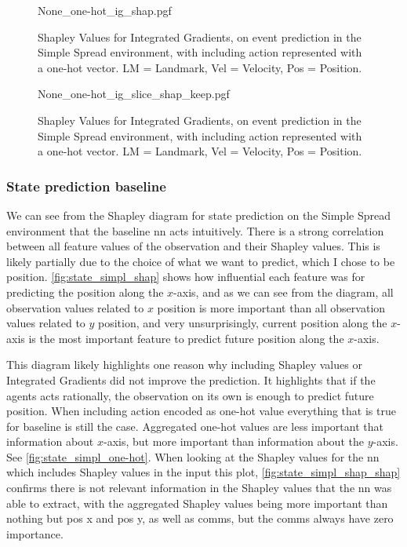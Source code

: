 \documentclass[UKenglish]{uiomasterthesis}
\begin{document}
\begin{figure}[H]
    \centering
{None_one-hot_ig_shap.pgf}
\caption{Shapley Values for Integrated Gradients, on event prediction in the Simple Spread environment, with including action represented with a one-hot vector. LM = Landmark, Vel = Velocity, Pos = Position.}
\label{fig:event_simpl_one-hot_ig_shap}
\end{figure}

\begin{figure}[H]
    \centering
{None_one-hot_ig_slice_shap_keep.pgf}
\caption{Shapley Values for Integrated Gradients, on event prediction in the Simple Spread environment, with including action represented with a one-hot vector. LM = Landmark, Vel = Velocity, Pos = Position.}
\label{fig:event_simpl_one-hot_ig_slice}
\end{figure}

\subsubsection{State prediction baseline}
We can see from the Shapley diagram for state prediction on the Simple Spread environment that the baseline \ac{nn} acts intuitively. There is a strong correlation between all feature values of the observation and their Shapley values. This is likely partially due to the choice of what we want to predict, which I chose to be position. \cref{fig:state_simpl_shap} shows how influential each feature was for predicting the position along the $x$-axis, and as we can see from the diagram, all observation values related to $x$ position is more important than all observation values related to $y$ position, and very unsurprisingly, current position along the $x$-axis is the most important feature to predict future position along the $x$-axis.

This diagram likely highlights one reason why including Shapley values or Integrated Gradients did not improve the prediction. It highlights that if the agents acts rationally, the observation on its own is enough to predict future position. When including action encoded as one-hot value everything that is true for baseline is still the case. Aggregated one-hot values are less important that information about $x$-axis, but more important than information about the $y$-axis. See \cref{fig:state_simpl_one-hot}. When looking at the Shapley values for the \ac{nn} which includes Shapley values in the input this plot, \cref{fig:state_simpl_shap_shap} confirms there is not relevant information in the Shapley values that the \ac{nn} was able to extract, with the aggregated Shapley values being more important than nothing but pos x and pos y, as well as comms, but the comms always have zero importance.
\end{document}
